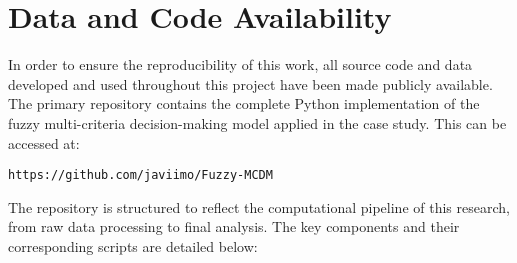 \newpage
\section*{Data and Code Availability}


In order to ensure the reproducibility of this work, all source code and data developed and used throughout this project have been made publicly available. The primary repository contains the complete Python implementation of the fuzzy multi-criteria decision-making model applied in the case study. This can be accessed at:
\begin{center}
    \texttt{https://github.com/javiimo/Fuzzy-MCDM}
\end{center}

The repository is structured to reflect the computational pipeline of this research, from raw data processing to final analysis. The key components and their corresponding scripts are detailed below:

